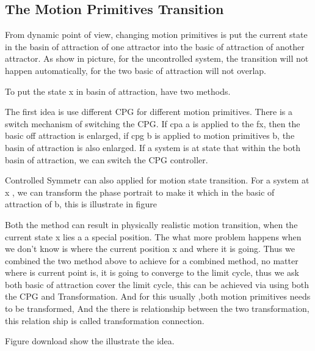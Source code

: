 \subsection{The Motion Primitives Transition}

From dynamic point of view, changing motion primitives is put the current state in the basin of attraction  of one attractor into the basic of attraction of another attractor.
As show in picture, for the uncontrolled system, the transition will not happen automatically, for the two basic of attraction will not overlap.

To put the state x in basin of attraction, have two methods.
\begin{itemize}
The first idea is use different CPG for different motion primitives. There is a switch mechanism of switching the CPG.
If cpa a is applied to the fx, then the basic off attraction is enlarged, if cpg b is applied to motion primitives b,
the basin of attraction is also enlarged.
If a system is at state that within the both basin of attraction, we can switch the CPG controller.

Controlled Symmetr can also applied for motion state transition.
For a system at x , we can transform the phase portrait to make it which in the basic of attraction of b,
this is illustrate in figure 
\end{itemize}

Both the method can result in physically realistic motion transition, when the current state x lies a a special position.
The what more problem happens when we don't know is where the current position x and where it is going.
Thus we combined the two method above to achieve for a combined method,
no matter where is current point is, it is going to converge to the limit cycle, thus we ask both basic of attraction cover the limit cycle, this can be achieved via using both the CPG and Transformation.
And for this usually ,both motion primitives needs to be transformed,
And the there is relationship between the two transformation,  this relation ship is called transformation connection.

Figure download show the illustrate the idea.


